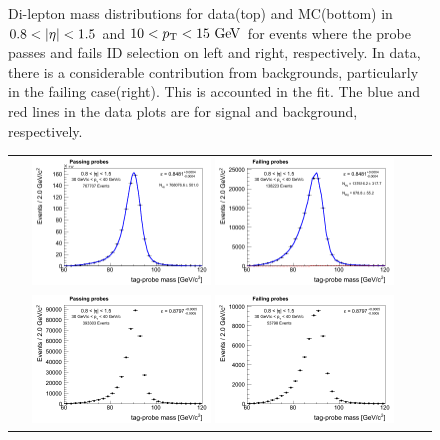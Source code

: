 \begin{figure}[htp]
\begin{tabular}{cc}
\end{tabular} 
\caption{Di-lepton mass distributions for data(top) and MC(bottom) 
         in $0.8<|\Eta|<1.5$ and $10 < p_\mathrm{T} < 15~\mathrm{Ge\kern -0.1em V}$ for events 
         where the probe passes and fails ID selection on left and right, 
         respectively. In data, there is a considerable contribution from backgrounds, 
         particularly in the failing case(right). This is accounted in the fit. 
         The blue and red lines in the data plots are for signal and background, respectively.} 
\label{fig:ideff_pt10to15_eta0p8to1p5} 
\end{figure} 
%
\begin{figure}[htp] 
\centering 
\begin{tabular}{cc} 
\includegraphics[width=0.45\textwidth]{figures/passetapt_data_13.png} 
\includegraphics[width=0.45\textwidth]{figures/failetapt_data_13.png}  \\
\includegraphics[width=0.45\textwidth]{figures/passetapt_mc_13.png} 
\includegraphics[width=0.45\textwidth]{figures/failetapt_mc_13.png} 

\end{tabular}
\end{figure}
